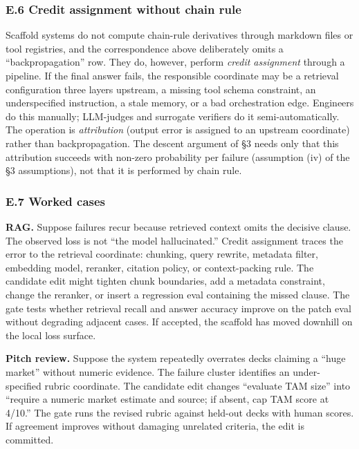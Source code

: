 \documentclass[
]{article}
\begin{document}
\subsubsection{E.6 Credit assignment without chain
rule}\label{e.6-credit-assignment-without-chain-rule}

Scaffold systems do not compute chain-rule derivatives through markdown
files or tool registries, and the correspondence above deliberately
omits a ``backpropagation'' row. They do, however, perform \emph{credit
assignment} through a pipeline. If the final answer fails, the
responsible coordinate may be a retrieval configuration three layers
upstream, a missing tool schema constraint, an underspecified
instruction, a stale memory, or a bad orchestration edge. Engineers do
this manually; LLM-judges and surrogate verifiers do it
semi-automatically. The operation is \emph{attribution} (output error is
assigned to an upstream coordinate) rather than backpropagation. The
descent argument of §3 needs only that this attribution succeeds with
non-zero probability per failure (assumption (iv) of the §3
assumptions), not that it is performed by chain rule.

\subsubsection{E.7 Worked cases}\label{e.7-worked-cases}

\textbf{RAG.} Suppose failures recur because retrieved context omits the
decisive clause. The observed loss is not ``the model hallucinated.''
Credit assignment traces the error to the retrieval coordinate:
chunking, query rewrite, metadata filter, embedding model, reranker,
citation policy, or context-packing rule. The candidate edit might
tighten chunk boundaries, add a metadata constraint, change the
reranker, or insert a regression eval containing the missed clause. The
gate tests whether retrieval recall and answer accuracy improve on the
patch eval without degrading adjacent cases. If accepted, the scaffold
has moved downhill on the local loss surface.

\textbf{Pitch review.} Suppose the system repeatedly overrates decks
claiming a ``huge market'' without numeric evidence. The failure cluster
identifies an under-specified rubric coordinate. The candidate edit
changes ``evaluate TAM size'' into ``require a numeric market estimate
and source; if absent, cap TAM score at 4/10.'' The gate runs the
revised rubric against held-out decks with human scores. If agreement
improves without damaging unrelated criteria, the edit is committed.
\end{document}
